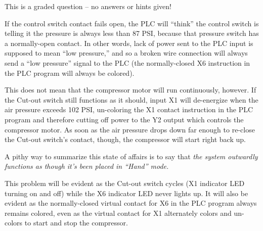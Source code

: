 \vfil 

\eject






This is a graded question -- no answers or hints given!







If the control switch contact fails open, the PLC will ``think'' the control switch is telling it the pressure is always less than 87 PSI, because that pressure switch has a normally-open contact.  In other words, lack of power sent to the PLC input is supposed to mean ``low pressure,'' and so a broken wire connection will always send a ``low pressure'' signal to the PLC (the normally-closed X6 instruction in the PLC program will always be colored).

This does not mean that the compressor motor will run continuously, however.  If the Cut-out switch still functions as it should, input X1 will de-energize when the air pressure exceeds 102 PSI, un-coloring the X1 contact instruction in the PLC program and therefore cutting off power to the Y2 output which controls the compressor motor.  As soon as the air pressure drops down far enough to re-close the Cut-out switch's contact, though, the compressor will start right back up.

\vskip 10pt

A pithy way to summarize this state of affairs is to say that {\it the system outwardly functions as though it's been placed in ``Hand'' mode.}

\vskip 10pt

This problem will be evident as the Cut-out switch cycles (X1 indicator LED turning on and off) while the X6 indicator LED never lights up.  It will also be evident as the normally-closed virtual contact for X6 in the PLC program always remains colored, even as the virtual contact for X1 alternately colors and un-colors to start and stop the compressor.



